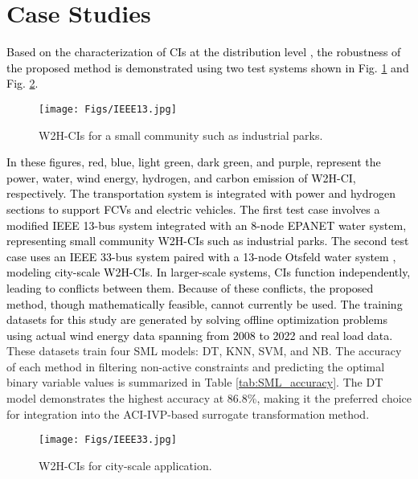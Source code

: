 \documentclass[conference]{IEEEtran}
\begin{document}
\section{Case Studies}  \label{sec: CaseStudy}
\textcolor{black}{Based on the characterization of CIs at the distribution level \cite{gilvanejad2021introduction}, the robustness of the proposed method is demonstrated using two test systems shown in Fig. \ref{pic: IEEE13} and Fig. \ref{pic: IEEE33}.}
\begin{figure}[!b]  
    \vspace{-.6cm}
  \centering
\texttt{[image: Figs/IEEE13.jpg]}
 \centering
 \vspace{-.3cm}
    \caption{W2H-CIs for a small community such as industrial parks.}
  \label{pic: IEEE13}   
\end{figure} 
\textcolor{black}{In these figures, red, blue, light green, dark green, and purple, represent the power, water, wind energy, hydrogen, and carbon emission of W2H-CI, respectively. The transportation system is integrated with power and hydrogen sections to support FCVs and electric vehicles.
The first test case involves a modified IEEE 13-bus system integrated with an 8-node EPANET water system, representing small community W2H-CIs such as industrial parks. The second test case uses an IEEE 33-bus system paired with a 13-node Otsfeld water system \cite{goodarzi2022security}, modeling city-scale W2H-CIs. In larger-scale systems, CIs function independently, leading to conflicts between them. Because of these conflicts, the proposed method, though mathematically feasible, cannot currently be used.
The training datasets for this study are generated by solving offline optimization problems using actual wind energy data spanning from 2008 to 2022 and real load data.} These datasets train four SML models: DT, KNN, SVM, and NB. The accuracy of each method in filtering non-active constraints and predicting the optimal binary variable values is summarized in Table \ref{tab:SML_accuracy}. The DT model demonstrates the highest accuracy at 86.8\%, making it the preferred choice for integration into the ACI-IVP-based surrogate transformation method. 
\begin{figure}[!t]  
  \centering
\texttt{[image: Figs/IEEE33.jpg]}
 \centering
 \vspace{-.3cm}
    \caption{W2H-CIs for city-scale application.}
  \label{pic: IEEE33}   
      \vspace{-.2cm}
\end{figure} 
\end{document}
